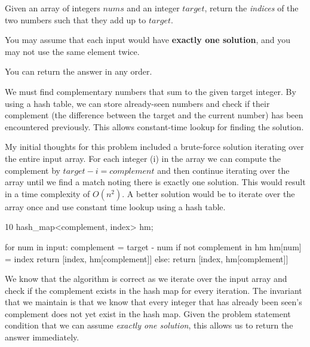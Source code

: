 
\label{prob:lc-001-two-sum}

\ProblemSummary
Given an array of integers \(nums\) and an integer \(target\), return the \textit{indices} of the two numbers such that they add up to \(target\).

You may assume that each input would have \textbf{exactly one solution}, and you may not use the same element twice. 

You can return the answer in any order. 

\KeyIdea
We must find complementary numbers that sum to the given target integer. By using a hash table, we can store already-seen numbers and check if their complement (the difference between the target and the current number) has been encountered previously. This allows constant-time lookup for finding the solution.

\begin{Thinking}
My initial thoughts for this problem included a brute-force solution iterating over the entire input array. For each integer (i) in the array we can compute the complement by $target - i = complement$ and then continue iterating over the array until we find a match noting there is exactly one solution. This would result in a time complexity of \(O(n^2)\). A better solution would be to iterate over the array once and use constant time lookup using a hash table.
\end{Thinking}

\Algorithm
\begin{CodeBlock}[style=pseudo,caption={Pseudocode}]{10}
  hash_map<complement, index> hm;

  for num in input:
    complement = target - num
    if not complement in hm
      hm[num] = index
      return [index, hm[complement]]
    else:
      return [index, hm[complement]]
\end{CodeBlock}

\Correctness
We know that the algorithm is correct as we iterate over the input array and check if the complement exists in the hash map for every iteration. The invariant that we maintain is that we know that every integer that has already been seen's complement does not yet exist in the hash map. Given the problem statement condition that we can assume \textit{exactly one solution}, this allows us to return the answer immediately.

